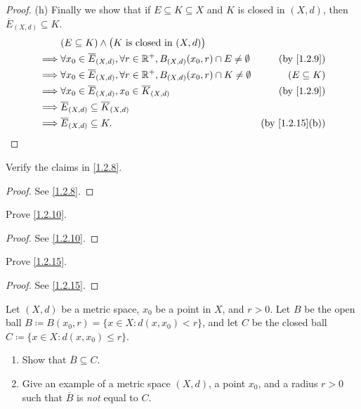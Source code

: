 \begin{proof}{(h)}
  Finally we show that if \(E \subseteq K \subseteq X\) and \(K\) is closed in \((X, d)\), then \(\overline{E}_{(X, d)} \subseteq K\).
  \begin{align*}
             & (E \subseteq K) \land \big(K \text{ is closed in } (X, d)\big)                                                                     \\
    \implies & \forall x_0 \in \overline{E}_{(X, d)}, \forall r \in \R^+, B_{(X, d)}(x_0, r) \cap E \neq \emptyset & \text{(by \cref{1.2.9})}     \\
    \implies & \forall x_0 \in \overline{E}_{(X, d)}, \forall r \in \R^+, B_{(X, d)}(x_0, r) \cap K \neq \emptyset & (E \subseteq K)              \\
    \implies & \forall x_0 \in \overline{E}_{(X, d)}, x_0 \in \overline{K}_{(X, d)}                                & \text{(by \cref{1.2.9})}     \\
    \implies & \overline{E}_{(X, d)} \subseteq \overline{K}_{(X, d)}                                                                              \\
    \implies & \overline{E}_{(X, d)} \subseteq K.                                                                  & \text{(by \cref{1.2.15}(b))}
  \end{align*}
\end{proof}

\exercisesection

\begin{ex}\label{ex:1.2.1}
  Verify the claims in \cref{1.2.8}.
\end{ex}

\begin{proof}
  See \cref{1.2.8}.
\end{proof}

\begin{ex}\label{ex:1.2.2}
  Prove \cref{1.2.10}.
\end{ex}

\begin{proof}
  See \cref{1.2.10}.
\end{proof}

\begin{ex}\label{ex:1.2.3}
  Prove \cref{1.2.15}.
\end{ex}

\begin{proof}
  See \cref{1.2.15}.
\end{proof}

\begin{ex}\label{ex:1.2.4}
  Let \((X, d)\) be a metric space, \(x_0\) be a point in \(X\), and \(r > 0\).
  Let \(B\) be the open ball \(B \coloneqq B(x_0, r) = \{x \in X : d(x, x_0) < r\}\), and let \(C\) be the closed ball \(C \coloneqq \{x \in X : d(x, x_0) \leq r\}\).
  \begin{enumerate}
    \item Show that \(\overline{B} \subseteq C\).
    \item Give an example of a metric space \((X, d)\), a point \(x_0\), and a radius \(r > 0\) such that \(\overline{B}\) is \emph{not} equal to \(C\).
  \end{enumerate}
\end{ex}

